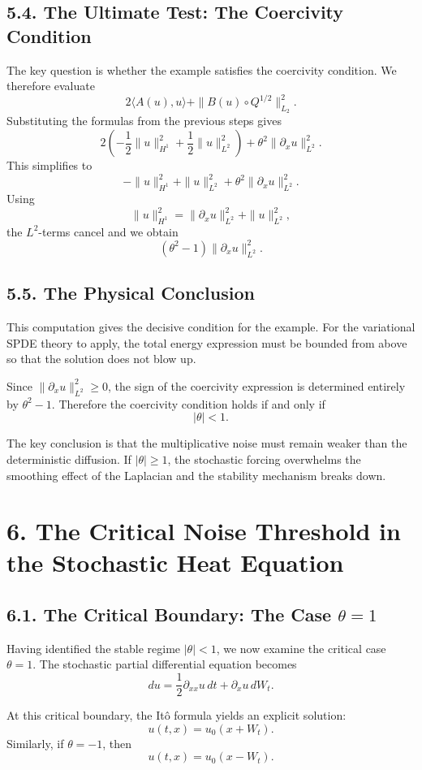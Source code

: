 \documentclass[11pt]{article}
\theoremstyle{definition}
\theoremstyle{remark}
\begin{document}
\subsection*{5.4. The Ultimate Test: The Coercivity Condition}
The key question is whether the example satisfies the coercivity condition. We therefore evaluate
\[
2\langle A(u),u\rangle+\|B(u)\circ Q^{1/2}\|_{L_2}^2.
\]
Substituting the formulas from the previous steps gives
\[
2\left(
-\frac12 \|u\|_{H^1}^2+\frac12 \|u\|_{L^2}^2
\right)
+
\theta^2\|\partial_x u\|_{L^2}^2.
\]
This simplifies to
\[
-\|u\|_{H^1}^2+\|u\|_{L^2}^2+\theta^2\|\partial_x u\|_{L^2}^2.
\]
Using
\[
\|u\|_{H^1}^2=\|\partial_x u\|_{L^2}^2+\|u\|_{L^2}^2,
\]
the \(L^2\)-terms cancel and we obtain
\[
(\theta^2-1)\|\partial_x u\|_{L^2}^2.
\]

\subsection*{5.5. The Physical Conclusion}
This computation gives the decisive condition for the example. For the variational SPDE theory to apply, the total energy expression must be bounded from above so that the solution does not blow up.

Since \(\|\partial_x u\|_{L^2}^2\ge 0\), the sign of the coercivity expression is determined entirely by \(\theta^2-1\). Therefore the coercivity condition holds if and only if
\[
|\theta|<1.
\]

The key conclusion is that the multiplicative noise must remain weaker than the deterministic diffusion. If \(|\theta|\ge 1\), the stochastic forcing overwhelms the smoothing effect of the Laplacian and the stability mechanism breaks down.

\section*{6. The Critical Noise Threshold in the Stochastic Heat Equation}

\subsection*{6.1. The Critical Boundary: The Case \(\theta=1\)}
Having identified the stable regime \(|\theta|<1\), we now examine the critical case \(\theta=1\). The stochastic partial differential equation becomes
\[
du=\frac12 \partial_{xx}u\,dt+\partial_x u\,dW_t.
\]

At this critical boundary, the It\^o formula yields an explicit solution:
\[
u(t,x)=u_0(x+W_t).
\]
Similarly, if \(\theta=-1\), then
\[
u(t,x)=u_0(x-W_t).
\]
\end{document}
